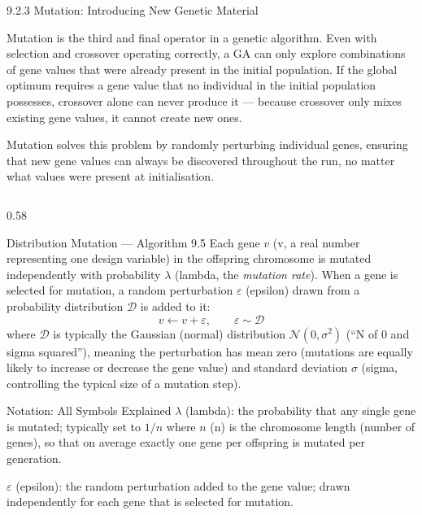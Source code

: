 \documentclass[aspectratio=169,10pt]{beamer}
\begin{document}
\begin{frame}[allowframebreaks]{9.2.3 Mutation: Introducing New Genetic Material}

  Mutation is the third and final operator in a genetic algorithm.
  Even with selection and crossover operating correctly, a GA can
  only explore combinations of gene values that were already present
  in the initial population.  If the global optimum requires a gene
  value that no individual in the initial population possesses,
  crossover alone can never produce it --- because crossover only
  mixes existing gene values, it cannot create new ones.

  Mutation solves this problem by randomly perturbing individual
  genes, ensuring that new gene values can always be discovered
  throughout the run, no matter what values were present at
  initialisation.

  \begin{columns}[T]
    \begin{column}{0.58\textwidth}
      \begin{block}{Distribution Mutation --- Algorithm 9.5}
        Each gene $v$ (v, a real number representing one design
        variable) in the offspring chromosome is mutated independently
        with probability $\lambda$ (lambda, the \emph{mutation rate}).
        When a gene is selected for mutation, a random perturbation
        $\varepsilon$ (epsilon) drawn from a probability distribution
        $\mathcal{D}$ is added to it:
        \[
          v \leftarrow v + \varepsilon,
          \qquad
          \varepsilon \sim \mathcal{D}
        \]
        where $\mathcal{D}$ is typically the Gaussian (normal)
        distribution $\mathcal{N}(0, \sigma^2)$ (``N of 0 and sigma
        squared''), meaning the perturbation has mean zero (mutations
        are equally likely to increase or decrease the gene value)
        and standard deviation $\sigma$ (sigma, controlling the
        typical size of a mutation step).
      \end{block}

      \begin{block}{Notation: All Symbols Explained}
        $\lambda$ (lambda): the probability that any single gene is
        mutated; typically set to $1/n$ where $n$ (n) is the
        chromosome length (number of genes), so that on average
        exactly one gene per offspring is mutated per generation.

        $\varepsilon$ (epsilon): the random perturbation added to the
        gene value; drawn independently for each gene that is
        selected for mutation.


\end{block}
\end{column}
\end{columns}
\end{frame}
\end{document}
